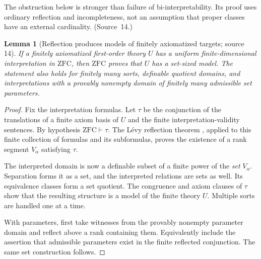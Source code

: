 \documentclass[11pt,letterpaper]{article}
\newtheorem{lemma}[lemma]{Lemma}\aliascntresetthe{lemma}
\theoremstyle{definition}
\theoremstyle{remark}
\newcommand{\ZFC}{\mathrm{ZFC}}
\begin{document}
The obstruction below is stronger than failure of bi-interpretability. Its proof
uses ordinary reflection and incompleteness, not an assumption that proper classes
have an external cardinality. (Source~14.)

\begin{lemma}[Reflection produces models of finitely axiomatized targets; source 14]
\label{hset:sf:lem:reflect}
If a finitely axiomatized first-order theory $U$ has a uniform finite-dimensional
interpretation in $\ZFC$, then $\ZFC$ proves that $U$ has a set-sized model. The
statement also holds for finitely many sorts, definable quotient domains, and
interpretations with a provably nonempty domain of finitely many admissible set
parameters.
\end{lemma}
\begin{proof}
Fix the interpretation formulas. Let $\tau$ be the conjunction of the translations
of a finite axiom basis of $U$ and the finite interpretation-validity sentences. By
hypothesis $\ZFC\vdash\tau$. The L\'evy reflection theorem \cite{Levy}, applied to
this finite collection of formulas and its subformulas, proves the existence of a
rank segment $V_\alpha$ satisfying $\tau$.

The interpreted domain is now a definable subset of a finite power of the
\emph{set} $V_\alpha$. Separation forms it as a set, and the interpreted relations
are sets as well. Its equivalence classes form a set quotient. The congruence and
axiom clauses of $\tau$ show that the resulting structure is a model of the finite
theory $U$. Multiple sorts are handled one at a time.

With parameters, first take witnesses from the provably nonempty parameter domain
and reflect above a rank containing them. Equivalently include the assertion that
admissible parameters exist in the finite reflected conjunction. The same set
construction follows.
\end{proof}
\end{document}
